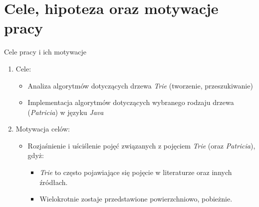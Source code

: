\documentclass[aspectratio=1610,english]{beamer} %
\begin{document}
  	\section{Cele, hipoteza oraz motywacje pracy}
	\begin{frame}{Cele pracy i ich motywacje}{}
	    \begin{enumerate}
	        \item Cele:
                \begin{itemize}
                    \footnotesize
                    \item {\color{AGH@green}Analiza algorytmów} dotyczących {\color{AGH@green}drzewa \emph{Trie}} (tworzenie, przeszukiwanie)
                    \item {\color{AGH@green}Implementacja} algorytmów dotyczących wybranego rodzaju {\color{AGH@green}drzewa} ({\color{AGH@green}\emph{Patricia}}) w języku \emph{Java}
                \end{itemize}
	        
	        \item Motywacja celów:
	            \begin{itemize}
                    \footnotesize
	                \item {\color{AGH@green}Rozjaśnienie i uściślenie pojęć} związanych z pojęciem {\color{AGH@green}\emph{Trie}} (oraz {\color{AGH@green}\emph{Patricia}}), {\color{AGH@green}gdyż:}
	                \begin{itemize}
                        \footnotesize
    	                \item {\color{AGH@green}\emph{Trie} to często pojawiające się pojęcie} w literaturze oraz innych źródłach. 
    	                \item {\color{AGH@green}Wielokrotnie} zostaje {\color{AGH@green}przedstawione powierzchniowo}, pobieżnie. 
	                \end{itemize}
	            \end{itemize}
	    \end{enumerate}
	\end{frame}
	
\end{document}
